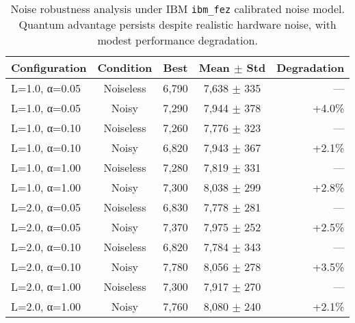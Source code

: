 \begin{table}[htb]
    \centering
    \caption{Noise robustness analysis under IBM \texttt{ibm\_fez} calibrated noise model. Quantum advantage persists despite realistic hardware noise, with modest performance degradation.}
    \label{tab:noise_robustness}
    \begin{tabular}{lcccr}
        \toprule
        Configuration & Condition & Best & Mean $\pm$ Std & Degradation \\
        \midrule
        L=1.0, α=0.05 & Noiseless & 6,790 & 7,638 $\pm$ 335 & — \\
        L=1.0, α=0.05 & Noisy & 7,290 & 7,944 $\pm$ 378 & +4.0\% \\
        \addlinespace
        L=1.0, α=0.10 & Noiseless & 7,260 & 7,776 $\pm$ 323 & — \\
        L=1.0, α=0.10 & Noisy & 6,820 & 7,943 $\pm$ 367 & +2.1\% \\
        \addlinespace
        L=1.0, α=1.00 & Noiseless & 7,280 & 7,819 $\pm$ 331 & — \\
        L=1.0, α=1.00 & Noisy & 7,300 & 8,038 $\pm$ 299 & +2.8\% \\
        \addlinespace
        L=2.0, α=0.05 & Noiseless & 6,830 & 7,778 $\pm$ 281 & — \\
        L=2.0, α=0.05 & Noisy & 7,370 & 7,975 $\pm$ 252 & +2.5\% \\
        \addlinespace
        L=2.0, α=0.10 & Noiseless & 6,820 & 7,784 $\pm$ 343 & — \\
        L=2.0, α=0.10 & Noisy & 7,780 & 8,056 $\pm$ 278 & +3.5\% \\
        \addlinespace
        L=2.0, α=1.00 & Noiseless & 7,300 & 7,917 $\pm$ 270 & — \\
        L=2.0, α=1.00 & Noisy & 7,760 & 8,080 $\pm$ 240 & +2.1\% \\
        \bottomrule
    \end{tabular}
\end{table}